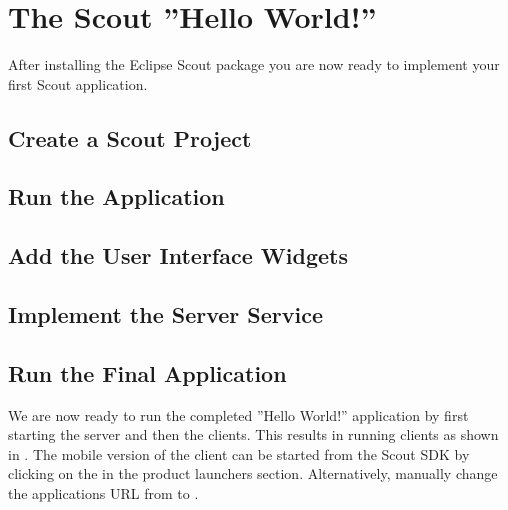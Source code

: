 \documentclass{article}
\begin{document}
\section*{The Scout ''Hello World!''}

After installing the Eclipse Scout package you are now ready to implement your first Scout application. 

\subsection*{Create a Scout Project}

\subsection*{Run the Application}

\subsection*{Add the User Interface Widgets}

\subsection*{Implement the Server Service}


\subsection*{Run the Final Application}

We are now ready to run the completed ''Hello World!'' application by first starting the server and then the clients. 
This results in running clients as shown in . 
The mobile version of the client can be started from the Scout SDK by clicking on the  in the product launchers section. 
Alternatively, manually change the applications URL from  to . 
\end{document}
